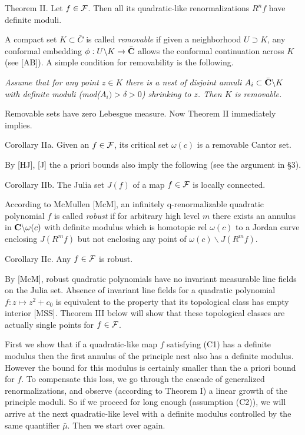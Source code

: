  

\proclaim Theorem II. Let $f\in {\cal F}$.  Then all its quadratic-like
 renormalizations $R^nf$ have definite moduli. 

A compact set $K\subset {\bar C}$ is called {\sl removable} if given a 
neighborhood $U\supset K$, any
conformal embedding $\phi: U\backslash K\rightarrow \bar{\bf C}$ allows
the conformal continuation across $K$ (see [AB]). 
A simple condition  for
removability is the following. \smallskip

{\sl Assume that for any point $z\in K$
there is a nest of disjoint annuli $A_i\subset \bar{\bf C}\backslash K$
with definite moduli (mod($A_i)>\delta>0$) shrinking to $z$. Then
$K$ is removable.} \smallskip

Removable sets have zero Lebesgue measure. Now  Theorem II
immediately implies.

\proclaim Corollary IIa. Given an $f\in {\cal F}$,
its critical set $\omega(c)$ is a removable Cantor set. 


By [HJ], [J] the a priori bounds also imply
the following (see the argument in \S 3). 

\proclaim Corollary IIb. The Julia set
   $J(f)$ of a map $f\in {\cal F}$ is locally connected.

According to McMullen [McM],  an infinitely q-renormalizable quadratic polynomial 
$f$ is called  {\sl robust} if for arbitrary high level $m$
there exists an annulus in ${\bf C}\backslash \omega(c)$
with definite modulus which is homotopic rel $\omega(c)$ to a Jordan curve
enclosing $J(R^m f)$
 but not enclosing any point of $\omega(c)\backslash J(R^mf)$. 


\proclaim Corollary IIc. Any $f\in {\cal F}$ is
  robust. 

By [McM], robust quadratic polynomials have no 
invariant measurable line fields on the Julia set. 
Absence of invariant line fields  for a quadratic polynomial 
$f: z\mapsto z^2+c_0$ is equivalent to the property
that its topological class has empty interior  [MSS].
Theorem III below will  show that these topological classes are actually
single points for $f\in {\cal F}$.

  

 

\medskip{} First we show that if a
quadratic-like map $f$ satisfying (C1) has a definite modulus then
the first  annulus of the principle nest also
has  a definite modulus. However the bound for this modulus is
certainly smaller than the a priori bound for $f$. 
To compensate this
loss, we go through the cascade of generalized renormalizations, and
observe (according to Theorem I)
 a linear growth of the principle moduli. So if we proceed for long
enough (assumption (C2)),
 we will arrive at the next quadratic-like level with a definite modulus
controlled by the same quantifier $\bar\mu$. Then we start over again. 

